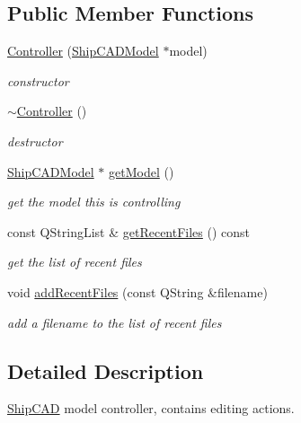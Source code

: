 \subsection*{Public Member Functions}
\begin{DoxyCompactItemize}
\item 
\hyperlink{classShipCAD_1_1Controller_a969bc231a8d15189a717acbca9146deb}{Controller} (\hyperlink{classShipCAD_1_1ShipCADModel}{Ship\-C\-A\-D\-Model} $\ast$model)
\begin{DoxyCompactList}\small\item\em constructor \end{DoxyCompactList}\item 
\hyperlink{classShipCAD_1_1Controller_a0ab87934c4f7a266cfdb86e0f36bc1b5}{$\sim$\-Controller} ()
\begin{DoxyCompactList}\small\item\em destructor \end{DoxyCompactList}\item 
\hyperlink{classShipCAD_1_1ShipCADModel}{Ship\-C\-A\-D\-Model} $\ast$ \hyperlink{classShipCAD_1_1Controller_a7868a3bac4ed86abff1fe5a0fabb4abd}{get\-Model} ()
\begin{DoxyCompactList}\small\item\em get the model this is controlling \end{DoxyCompactList}\item 
const Q\-String\-List \& \hyperlink{classShipCAD_1_1Controller_a3188f9f9d040945547e93005c1ce316e}{get\-Recent\-Files} () const 
\begin{DoxyCompactList}\small\item\em get the list of recent files \end{DoxyCompactList}\item 
void \hyperlink{classShipCAD_1_1Controller_aea72d61d10bd8eb70572438696ada3d3}{add\-Recent\-Files} (const Q\-String \&filename)
\begin{DoxyCompactList}\small\item\em add a filename to the list of recent files \end{DoxyCompactList}\end{DoxyCompactItemize}


\subsection{Detailed Description}
\hyperlink{namespaceShipCAD}{Ship\-C\-A\-D} model controller, contains editing actions. 

